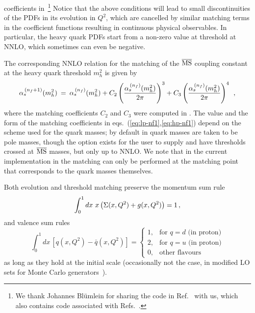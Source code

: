 coefficients
in~\cite{Bierenbaum:2009mv,Ablinger:2010ty,Kawamura:2012cr,Blumlein:2012vq,ABLINGER2014263,Ablinger:2014nga,Ablinger:2014vwa,Behring:2014eya,Ablinger:2019etw,Behring:2021asx,Fael:2022miw,Ablinger:2023ahe,Ablinger:2024xtt,BlumleinCode}\footnote{We
thank Johannes Bl\"umlein for sharing the code in
Ref.~\cite{BlumleinCode} with us, which also contains code associated
with Refs.~\cite{Ablinger:2024xtt,Fael:2022miw}.
%
}
%
Notice that the above
conditions will lead to small discontinuities of the PDFs in its
evolution in $Q^2$, which are cancelled by similar matching terms in
the coefficient functions resulting in continuous physical
observables. In particular, the heavy quark PDFs start from a non-zero
value at threshold at NNLO, which sometimes can even be negative.

The corresponding NNLO relation for the matching of the $\overline{\mathrm{MS}}$
coupling constant at the heavy quark threshold $m^2_h$ is given by 
\begin{equation}
\label{eq:as-nf1}
  \alpha_s^{\, (n_f+1)}(m_h^2) \: = \:
  \alpha_s^{\, (n_f)} (m_h^2) +   C_2 \left( \frac{\alpha_s^{\, (n_f)} (m_h^2)}{2\pi} \right)^3+   C_3 \left( \frac{\alpha_s^{\, (n_f)} (m_h^2)}{2\pi} \right)^4
   \:\: ,
\end{equation}
where the matching coefficients $C_2$ and $C_3$ were computed in
\cite{Chetyrkin:1997sg,Chetyrkin:1997un}.
%
The value and the form of the matching coefficients in
eqs.~(\ref{eq:lp-nf1},\ref{eq:hp-nf1}) depend on the scheme used for
the quark masses; by default in \hoppet quark masses are taken to be
pole masses, though the option exists for the user to supply and have
thresholds crossed at $\overline{\mathrm{MS}}$ masses, but only up to NNLO. We note
that in the current implementation in \hoppet the matching can only be
performed at the matching point that corresponds to the quark masses
themselves.

Both evolution and threshold matching preserve the momentum sum rule
\begin{equation}
  \int_0^1 dx~x \left( \Sigma(x,Q^2)+g(x,Q^2)\right) =1 \,,
\end{equation}
and valence sum rules
\begin{equation}
  \int_0^1 dx\, \left[q(x,Q^2)-{\bar q}(x,Q^2) \right] = \left\{ 
    \begin{array}{ll}
      1, & \text{for } q = d \text{ (in proton)}\\
      2, & \text{for } q = u \text{ (in proton)}\\
      0, & \text{other flavours}
    \end{array}
    \right.
\end{equation}
as long as they hold at the initial scale (occasionally not the case,
\eg in modified LO sets for Monte Carlo
generators~\cite{Sherstnev:2008dm}).

